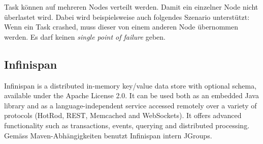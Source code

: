 Task können auf mehreren Nodes verteilt werden. Damit ein einzelner Node nicht überlastet wird. Dabei wird beispielsweise auch folgendes Szenario unterstützt: Wenn ein Task crashed, muss dieser von einem anderen Node übernommen werden. Es darf keinen \emph{single point of failure} geben.

\subsection{Infinispan}
Infinispan is a distributed in-memory key/value data store with optional schema, available under the Apache License 2.0. It can be used both as an embedded Java library and as a language-independent service accessed remotely over a variety of protocols (HotRod, REST, Memcached and WebSockets). It offers advanced functionality such as transactions, events, querying and distributed processing. Gemäss Maven-Abhängigkeiten benutzt Infinispan intern JGroups. 